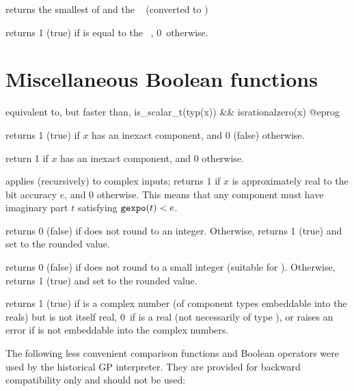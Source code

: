  returns the smallest of  and the
~ (converted to )


 returns 1 (true) if  is equal to
the ~, 0~otherwise.

\section{Miscellaneous Boolean functions}

 equivalent to, but faster than,
\bprog
  is_scalar_t(typ(x)) && isrationalzero(x)
@eprog

 returns 1 (true) if $x$ has an inexact
component, and 0 (false) otherwise.

 return 1 if $x$ has an inexact
 component, and 0  otherwise.

 applies (recursively) to complex inputs;
returns $1$ if $x$ is approximately real to the bit accuracy $e$, and 0
otherwise. This means that any  component must have imaginary part
$t$ satisfying ${\tt gexpo}(t) < e$.

 returns 0 (false) if  does not round
to an integer. Otherwise, returns 1 (true) and set  to the rounded
value.

 returns 0 (false) if  does not
round to a small integer (suitable for ). Otherwise, returns 1
(true) and set  to the rounded value.

 returns 1 (true) if  is a complex number
(of component types embeddable into the reals) but is not itself real, 0~if
 is a real (not necessarily of type ), or raises an error if
 is not embeddable into the complex numbers.


The following less convenient comparison functions and Boolean operators were
used by the historical GP interpreter. They are provided for backward
compatibility only and should not be used:




